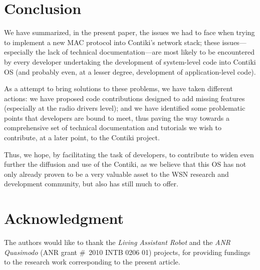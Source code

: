 \documentclass[12pt,a4paper]{article}
\begin{document}

\section{Conclusion}

We have summarized, in the present paper, the issues we had to face when
trying to implement a new MAC protocol into Contiki's network stack;
these issues---especially the lack of technical documentation---are
most likely to be encountered by every developer undertaking the
development of system-level code into Contiki OS (and probably
even, at a lesser degree, development of application-level code).

As a attempt to bring solutions to these problems, we have taken
different actions: we have proposed code contributions designed
to add missing features (especially at the radio drivers level);
and we have identified some problematic points that developers
are bound to meet, thus paving the way towards a comprehensive
set of technical documentation and tutorials we wish to contribute,
at a later point, to the Contiki project.

Thus, we hope, by facilitating the task of developers, to contribute
to widen even further the diffusion and use of the Contiki, as we
believe that this OS has not only already proven to be a very
valuable asset to the WSN research and development community, but also
has still much to offer.


\section*{Acknowledgment}

The authors would like to thank the \emph{Living Assistant Robot}
and the \emph{ANR Quasimodo} (ANR grant \#~2010 INTB 0206 01) projects,
for providing fundings to the research work corresponding
to the present article.




{\small
}
\end{document}
